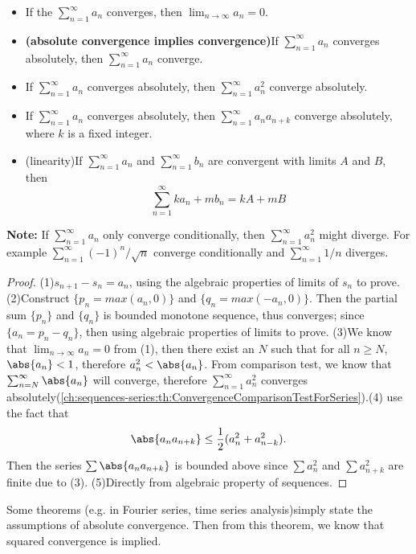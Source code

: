 \begin{refsection}
\begin{theorem}\cite[76]{johnsonbaugh2010foundations}\label{ch:sequences-series:th:importantseriesconvergenceresult}
\begin{itemize}
	\item If the $\sum_{n=1}^\infty a_n$ converges, then $\lim_{n\rightarrow \infty}a_n = 0$.
	\item \textbf{(absolute convergence implies convergence)}If $\sum_{n=1}^\infty a_n$ converges absolutely, then $\sum_{n=1}^\infty a_n$ converge.
	\item If $\sum_{n=1}^\infty a_n$ converges absolutely, then $\sum_{n=1}^\infty a_n^2$ converge absolutely.
		\item If $\sum_{n=1}^\infty a_n$ converges absolutely, then $\sum_{n=1}^\infty a_na_{n+k}$ converge absolutely, where $k$ is a fixed integer.
	\item (linearity)If $\sum_{n=1}^\infty a_n$ and $\sum_{n=1}^\infty b_n$ are convergent with limits $A$ and $B$, then
	$$\sum_{n=1}^\infty k a_n + m b_n = kA+mB $$
\end{itemize}

\textbf{Note:} If $\sum_{n=1}^\infty a_n$ only converge conditionally, then $\sum_{n=1}^\infty a_n^2$ might diverge. For example $\sum_{n=1}^\infty (-1)^n/\sqrt{n}$ converge conditionally and $\sum_{n=1}^\infty 1/n$ diverges.
\end{theorem}
\begin{proof}
(1)$s_{n+1}-s_n =a_n$, using the algebraic properties of limits of $s_n$ to prove.	(2)Construct $\{p_n = max(a_n,0)\}$ and $\{q_n = max(-a_n,0)\}$. Then the partial sum $\{p_n\}$ and $\{q_n\}$ is bounded monotone sequence, thus converges; since $\{a_n = p_n - q_n\}$, then using algebraic properties of limits to prove. (3)We know that $\lim_{n\to \infty} a_n =0$ from (1), then there exist an $N$ such that  for all $n \geq N$, $\abs{a_n} < 1$, therefore $a_n^2 < \abs{a_n}$. From comparison test, we know that $\sum_{n=N}^\infty \abs{a_n}$ will converge, therefore $\sum_{n=1}^\infty a_n^2$ converges absolutely(\autoref{ch:sequences-series:th:ConvergenceComparisonTestForSeries}).(4) use the fact that 
$$\abs{a_na_{n+k}} \leq \frac{1}{2}(a_n^2 + a_{n-k}^2).$$
Then the series $\sum \abs{a_na_{n+k}} $ is bounded above since $\sum a_n^2$ and $\sum a_{n+k}^2$ are finite due to (3).
 (5)Directly from algebraic property of sequences.
\end{proof}


\begin{remark}
Some theorems (e.g. in Fourier series, time series analysis)simply state the assumptions of absolute convergence. Then from this theorem, we know that squared convergence is implied.
\end{remark}


\end{refsection}
